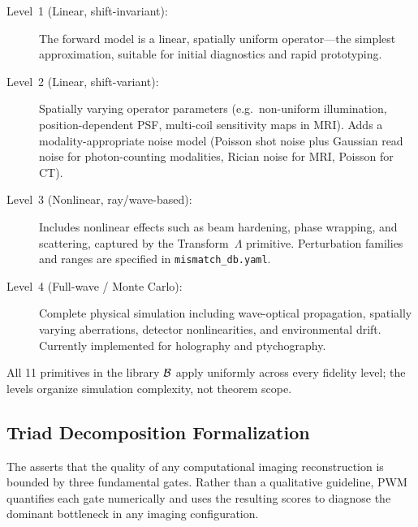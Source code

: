 \begin{description}
  \item[Level~1 (Linear, shift-invariant):]  The forward model is a
    linear, spatially uniform operator---the simplest approximation,
    suitable for initial diagnostics and rapid prototyping.
  \item[Level~2 (Linear, shift-variant):]  Spatially varying operator
    parameters (e.g.\ non-uniform illumination, position-dependent PSF,
    multi-coil sensitivity maps in MRI).  Adds a modality-appropriate
    noise model (Poisson shot noise plus Gaussian read noise for
    photon-counting modalities, Rician noise for MRI, Poisson for CT).
  \item[Level~3 (Nonlinear, ray/wave-based):]  Includes nonlinear
    effects such as beam hardening, phase wrapping, and scattering,
    captured by the Transform~$\Lambda$ primitive.
    Perturbation families and ranges are specified in
    \texttt{mismatch\_db.yaml}.
  \item[Level~4 (Full-wave / Monte Carlo):]  Complete physical
    simulation including wave-optical propagation, spatially varying
    aberrations, detector nonlinearities, and environmental drift.
    Currently implemented for holography and ptychography.
\end{description}

\noindent All 11 primitives in the library $\mathcal{B}$ apply uniformly across every fidelity level; the levels organize simulation complexity, not theorem scope.


\subsection*{Triad Decomposition Formalization}
\label{sec:methods:triad}

The \triad{} asserts that the quality of any computational imaging
reconstruction is bounded by three fundamental gates.  Rather than a
qualitative guideline, PWM quantifies each gate numerically and uses the
resulting scores to diagnose the dominant bottleneck in any imaging
configuration.

